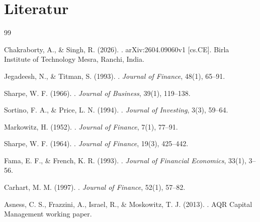 
\chapter{Literatur}

\label{app:literatur}

\begin{thebibliography}{99}

Chakraborty, A., \& Singh, R. (2026).
\newblock {}.
\newblock arXiv:2604.09060v1 [cs.CE].
\newblock Birla Institute of Technology Mesra, Ranchi, India.

Jegadeesh, N., \& Titman, S. (1993).
\newblock {}.
\newblock \emph{Journal of Finance}, 48(1), 65--91.

Sharpe, W. F. (1966).
\newblock {}.
\newblock \emph{Journal of Business}, 39(1), 119--138.

Sortino, F. A., \& Price, L. N. (1994).
\newblock {}.
\newblock \emph{Journal of Investing}, 3(3), 59--64.

Markowitz, H. (1952).
\newblock {}.
\newblock \emph{Journal of Finance}, 7(1), 77--91.

Sharpe, W. F. (1964).
\newblock {}.
\newblock \emph{Journal of Finance}, 19(3), 425--442.

Fama, E. F., \& French, K. R. (1993).
\newblock {}.
\newblock \emph{Journal of Financial Economics}, 33(1), 3--56.

Carhart, M. M. (1997).
\newblock {}.
\newblock \emph{Journal of Finance}, 52(1), 57--82.

Asness, C. S., Frazzini, A., Israel, R., \& Moskowitz, T. J. (2013).
\newblock {}.
\newblock AQR Capital Management working paper.


\end{thebibliography}
